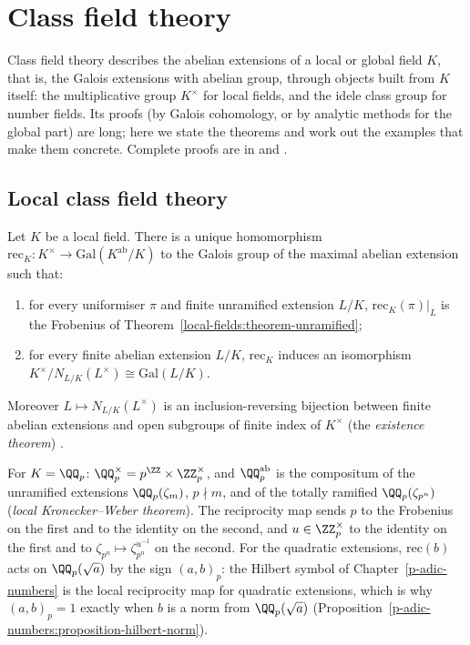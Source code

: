 \section{Class field theory}\label{local-fields:section-class-field-theory}

Class field theory describes the abelian extensions of a local or global field $K$, that is, the Galois extensions with abelian group, through objects built from $K$ itself: the multiplicative group
$K^\times$ for local fields, and the idele class group for number fields. Its proofs (by Galois cohomology, or by analytic methods for the global part) are long; here we state the theorems and work out
the examples that make them concrete. Complete proofs are in \cite{neukirch-ant} and \cite{cassels-frohlich}.

\subsection{Local class field theory}\label{local-fields:subsection-local-cft}

\begin{theorem}\label{local-fields:theorem-local-cft}
Let $K$ be a local field. There is a unique homomorphism $\mathrm{rec}_K \colon K^\times \to \mathrm{Gal}(K^{\mathrm{ab}}/K)$ to the Galois group of the maximal abelian extension such that:
\begin{enumerate}
\item for every uniformiser $\pi$ and finite unramified extension $L/K$, $\mathrm{rec}_K(\pi)|_L$ is the Frobenius of Theorem~\ref{local-fields:theorem-unramified};
\item for every finite abelian extension $L/K$, $\mathrm{rec}_K$ induces an isomorphism $K^\times/N_{L/K}(L^\times) \cong \mathrm{Gal}(L/K)$.
\end{enumerate}
Moreover $L \mapsto N_{L/K}(L^\times)$ is an inclusion-reversing bijection between finite abelian extensions and open subgroups of finite index of $K^\times$ (the \emph{existence theorem})
\cite[Chapter V, \S 1]{neukirch-ant}.
\end{theorem}

\begin{example}\label{local-fields:example-local-cft-qp}
For $K = \QQ_p$: $\QQ_p^\times = p^\ZZ \times \ZZ_p^\times$, and $\QQ_p^{\mathrm{ab}}$ is the compositum of the unramified extensions $\QQ_p(\zeta_m)$, $p \nmid m$, and of the totally ramified
$\QQ_p(\zeta_{p^n})$ (\emph{local Kronecker--Weber theorem}). The reciprocity map sends $p$ to the Frobenius on the first and to the identity on the second, and $u \in \ZZ_p^\times$ to the identity on the
first and to $\zeta_{p^n} \mapsto \zeta_{p^n}^{u^{-1}}$ on the second. For the quadratic extensions, $\mathrm{rec}(b)$ acts on $\QQ_p(\sqrt a)$ by the sign $(a, b)_p$: the Hilbert symbol of
Chapter~\ref{p-adic-numbers} is the local reciprocity map for quadratic extensions, which is why $(a, b)_p = 1$ exactly when $b$ is a norm from $\QQ_p(\sqrt a)$
(Proposition~\ref{p-adic-numbers:proposition-hilbert-norm}).
\end{example}

